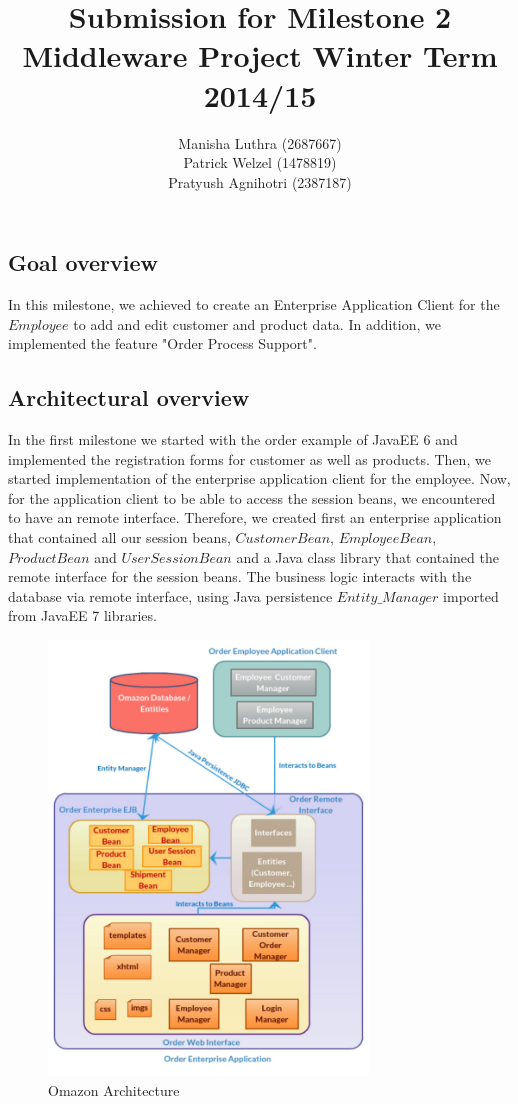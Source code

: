 \documentclass[twoside,colorbacktitle,accentcolor=tud1b]{tudexercise}
\title{Submission for Milestone 2
\linebreak[1] Middleware Project
\linebreak[1] Winter Term 2014/15}
\subtitle{Manisha Luthra (2687667) \\
Patrick Welzel (1478819)\\
Pratyush Agnihotri (2387187)}
\begin{document}
  \begin{examheader}
  \end{examheader}
\setcounter{section}{2}
\maketitle
  \subsection{Goal overview}
  In this milestone, we achieved to create an Enterprise Application Client for the $Employee$ to add and edit customer and product data. In addition, we implemented the feature "Order Process Support".
  \subsection{Architectural overview}

In the first milestone we started with the order example of JavaEE 6 and implemented the registration forms for customer as well as products. Then, we started implementation of the enterprise application client for the employee. Now, for the application client to be able to access the session beans, we encountered to have an remote interface. Therefore, we created first an enterprise application that contained all our session beans, $CustomerBean$, $EmployeeBean$, $ProductBean$ and $UserSessionBean$ and a Java class library that contained the remote interface for the session beans. The business logic interacts with the database via remote interface, using Java persistence $Entity\_Manager$ imported from JavaEE 7 libraries.

\begin{figure}[h!]
  \centering
   \includegraphics[width=85mm]{architecture}
   \caption{Omazon Architecture}
\end{figure}
\end{document}
